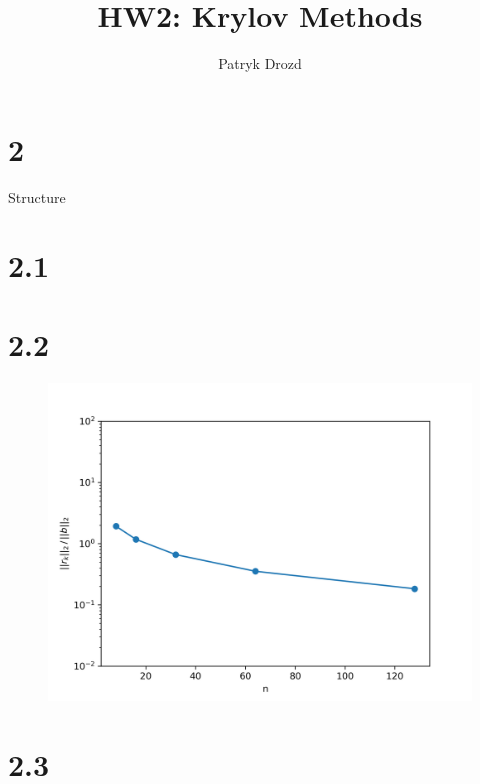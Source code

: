 \documentclass[a4paper]{article}
\title{HW2: Krylov Methods}
\author{Patryk Drozd}
\begin{document}
\date{}
\maketitle

\section{2}
	Structure

\section{2.1}

\section{2.2}


	\begin{figure}[h!]
	    \centering
    	\includegraphics[width=.8\linewidth]{./q2_fig.png}
	\end{figure}

\section{2.3}
		



 
 
\end{document}
